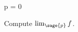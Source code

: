 \documentclass{ximera}
\author{Jim Fowler}
\begin{document}
\begin{sagesilent}
  p = 0
\end{sagesilent}

\begin{exercise}

  Compute $\lim_{\sage{p}} f$.


  
\end{exercise}
\end{document}
